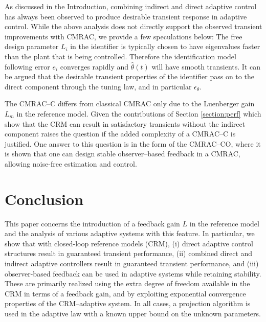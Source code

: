 \documentclass[10pt,journal]{IEEEtran}
\theoremstyle{plain}%
\theoremstyle{definition}
\begin{document}
As discussed in the Introduction, combining indirect and direct adaptive control has always been observed to produce desirable transient response in adaptive control. 
While the above analysis does not directly support the observed transient improvements with CMRAC, we provide a few speculations below: The free design parameter $L_i$ in the identifier is typically chosen to have eigenvalues faster than the plant that is being controlled. Therefore the identification model following error $e_i$ converges rapidly and $\hat\theta(t)$ will have smooth transients. It can be argued that the desirable transient properties of the identifier pass on to the direct component through the tuning law, and in particular $\epsilon_\theta$.

The CMRAC--C differs from classical CMRAC only due to the Luenberger gain $L_m$ in the reference model. Given the contributions of Section \ref{section:perf} which show that the CRM can result in satisfactory transients without the indirect component raises the question if the added complexity of a CMRAC--C is justified. One answer to this question is in the form of the CMRAC--CO, where it is shown that one can design stable observer--based feedback in a CMRAC, allowing noise-free estimation and control.

\section{Conclusion}
This paper concerns the introduction of a feedback gain $L$ in the reference model and the analysis of various adaptive systems with this feature. In particular, we show that with closed-loop reference models (CRM), (i) direct adaptive control structures result in guaranteed transient performance, (ii) combined direct and indirect adaptive controllers result in guaranteed transient performance, and (iii) observer-based feedback can be used in adaptive systems while retaining stability. These are primarily realized using the extra degree of freedom available in the CRM in terms of a feedback gain, and by exploiting exponential convergence properties of the CRM--adaptive system. In all cases, a projection algorithm is used in the adaptive law with a known upper bound on the unknown parameters. 
\end{document}
